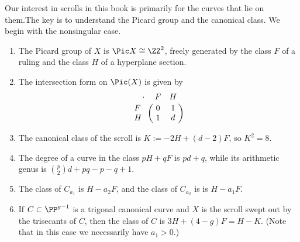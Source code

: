 Our interest in scrolls in this book is primarily for the curves that lie on them.The key is to understand the Picard group and the canonical class. We begin with the nonsingular case.

\begin{theorem}\label{pic of scroll}
\begin{enumerate} Suppose in addition that $a_{1}>0$.

\item The Picard group of $X$ is $\Pic X \cong \ZZ^2$, freely generated by  the class $F$ of a ruling and the class $H$ of a  hyperplane section. 
\item The
intersection form on $\Pic(X)$ is given by
$$
\bordermatrix{\kern 10pt\cdot&F&H\cr
F&0&1\cr
H&1&d
}
$$

\item The canonical class of the scroll is $K := -2H +(d-2)F$, so $K^2 = 8$.

\item The degree of a curve in the class $pH+qF$ is $pd+q$, while its arithmetic genus is
${p\choose 2}d+pq-p-q+1$.

\item The class of $C_{a_1}$
is $H-a_2F$, and the class of $C_{a_2}$ is 
is $H-a_1F$. 
\item If $C \subset \PP^{g-1}$ is a trigonal canonical curve and $X$ is the scroll swept out by the trisecants of $C$, then the class of $C$ is $3H+(4-g)F = H-K$. (Note that in this case we necessarily have $a_1 > 0$.)
\end{enumerate}
\end{theorem}


